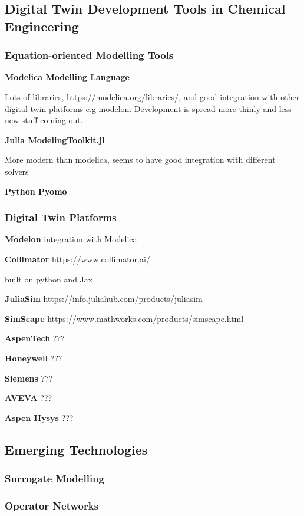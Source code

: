\subsection{Digital Twin Development Tools in Chemical Engineering}


\subsubsection{Equation-oriented Modelling Tools}








\textbf{Modelica Modelling Language}

Lots of libraries, https://modelica.org/libraries/, and good integration with other digital twin platforms e.g modelon. Development is spread more thinly and less new stuff coming out.


\textbf{Julia ModelingToolkit.jl}

More modern than modelica, seems to have good integration with different solvers


\textbf{Python Pyomo}



\subsubsection{Digital Twin Platforms}

\textbf{Modelon}
integration with Modelica 

\textbf{Collimator}
https://www.collimator.ai/


built on python and Jax

\textbf{JuliaSim}
https://info.juliahub.com/products/juliasim


\textbf{SimScape}
https://www.mathworks.com/products/simscape.html

\textbf{AspenTech} ???

\textbf{Honeywell} ???

\textbf{Siemens} ???

\textbf{AVEVA} ???

\textbf{Aspen Hysys} ???


\subsection{Emerging Technologies }





\subsubsection{Surrogate Modelling}

\subsubsection{Operator Networks}



